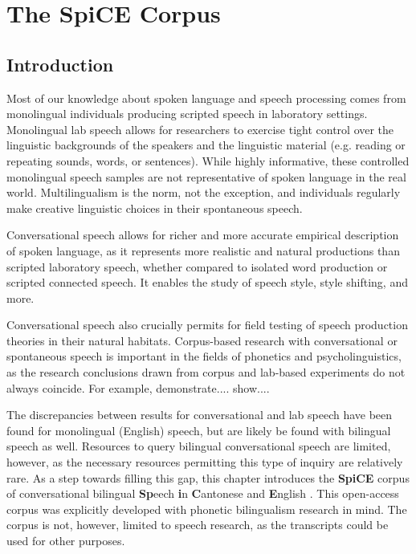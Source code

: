
\chapter{The SpiCE Corpus}
\label{ch:Corpus}

\section{Introduction}\label{ch2:sec:introduction}
Most of our knowledge about spoken language and speech processing comes from monolingual individuals producing scripted speech in laboratory settings. Monolingual lab speech allows for researchers to exercise tight control over the linguistic backgrounds of the speakers and the linguistic material (e.g. reading or repeating sounds, words, or sentences). While highly informative, these controlled monolingual speech samples are not representative of spoken language in the real world. Multilingualism is the norm, not the exception, and individuals regularly make creative linguistic choices in their spontaneous speech.

Conversational speech allows for richer and more accurate empirical description of spoken language, as it represents more realistic and natural productions than scripted laboratory speech, whether compared to isolated word production or scripted connected speech. It enables the study of speech style, style shifting, and more. 

Conversational speech also crucially permits for field testing of speech production theories in their natural habitats. Corpus-based research with conversational or spontaneous speech is important in the fields of phonetics and psycholinguistics, as the research conclusions drawn from corpus and lab-based experiments do not always coincide. For example, \citet{gahl_2012_reduce} demonstrate.... \citet{bell_2009_predictability} show....

The discrepancies between results for conversational and lab speech have been found for monolingual (English) speech, but are likely be found with bilingual speech as well. Resources to query bilingual conversational speech are limited, however, as the necessary resources permitting this type of inquiry are relatively rare. As a step towards filling this gap, this chapter introduces the \textbf{SpiCE} corpus of conversational bilingual \textbf{Sp}eech \textbf{i}n \textbf{C}antonese and \textbf{E}nglish \citep{johnson_2021_spice}. This open-access corpus was explicitly developed with phonetic bilingualism research in mind. The corpus is not, however, limited to speech research, as the transcripts could be used for other purposes.


